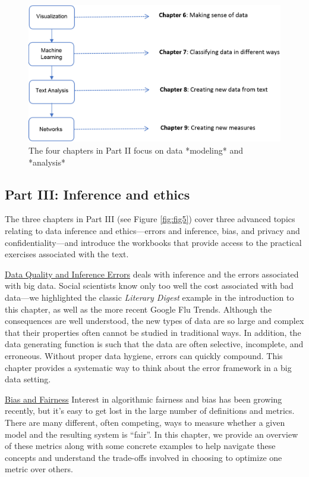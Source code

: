 \documentclass[]{krantz}
\begin{document}
\begin{figure}

{\centering \includegraphics[width=0.9\linewidth]{ChapterIntro/figures/Figure3_new} 

}

\caption{The four chapters in Part II focus on data *modeling* and *analysis*}\label{fig:fig4}
\end{figure}

\subsection{Part III: Inference and
ethics}\label{part-iii-inference-and-ethics}

The three chapters in Part III (see Figure \ref{fig:fig5}) cover three
advanced topics relating to data inference and ethics---errors and
inference, bias, and privacy and confidentiality---and introduce the
workbooks that provide access to the practical exercises associated with
the text.

\protect\hyperlink{chap:errors}{Data Quality and Inference Errors} deals
with inference and the errors associated with big data. Social
scientists know only too well the cost associated with bad data---we
highlighted the classic \emph{Literary Digest} example in the
introduction to this chapter, as well as the more recent Google Flu
Trends. Although the consequences are well understood, the new types of
data are so large and complex that their properties often cannot be
studied in traditional ways. In addition, the data generating function
is such that the data are often selective, incomplete, and erroneous.
Without proper data hygiene, errors can quickly compound. This chapter
provides a systematic way to think about the error framework in a big
data setting.

\protect\hyperlink{chap:bias}{Bias and Fairness} Interest in algorithmic
fairness and bias has been growing recently, but it's easy to get lost
in the large number of definitions and metrics. There are many
different, often competing, ways to measure whether a given model and
the resulting system is ``fair''. In this chapter, we provide an
overview of these metrics along with some concrete examples to help
navigate these concepts and understand the trade-offs involved in
choosing to optimize one metric over others.
\end{document}
